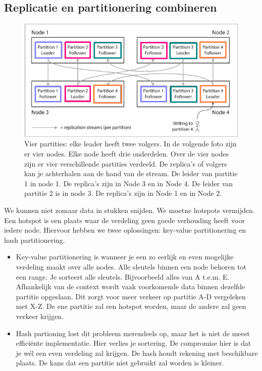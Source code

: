\documentclass[a4paper,10pt,twoside]{report}
\begin{document}
\subsection{Replicatie en partitionering combineren}

\begin{figure}
	\includegraphics[width=\linewidth]{../images/Screenshot_215.png}
	\caption{Vier partities: elke leader heeft twee volgers. In de volgende foto zijn er vier nodes. Elke node heeft drie onderdelen. Over de vier nodes zijn er vier verschillende partities verdeeld. De replica's of volgers kan je achterhalen aan de hand van de stream. De leider van partitie 1 in node 1. De replica's zijn in Node 3 en in Node 4. De leider van partitie 2 is in node 3. De replica's zijn in Node 1 en in Node 2.}
\end{figure}

We kunnen niet zomaar data in stukken snijden. We moetne hotspots vermijden. Een hotspot is een plaats waar de verdeling geen goede verhouding heeft voor iedere node. Hiervoor hebben we twee oplossingen: key-value partitionering en hash partitionering.

\begin{itemize}
	\item Key-value partitionering is wanneer je een zo eerlijk en even mogelijke verdeling maakt over alle nodes. Alle sleutels binnen een node behoren tot een range. Je sorteert alle sleutels. Bijvoorbeeld alles van A t.e.m. E. Afhankelijk van de context wordt vaak voorkomende data binnen dezelfde partitie opgeslaan. Dit zorgt voor meer verkeer op partitie A-D vergeleken met X-Z. De ene partitie zal een hotspot worden, maar de andere zal geen verkeer krijgen.
	\item Hash partioning lost dit probleem merendeels op, maar het is niet de meest efficiënte implementatie. Hier verlies je sortering. De compromise hier is dat je wél een even verdeling zal krijgen. De hash houdt rekening met beschikbare plaats. De kans dat een partitie niet gebruikt zal worden is kleiner. 
\end{itemize}
\end{document}
